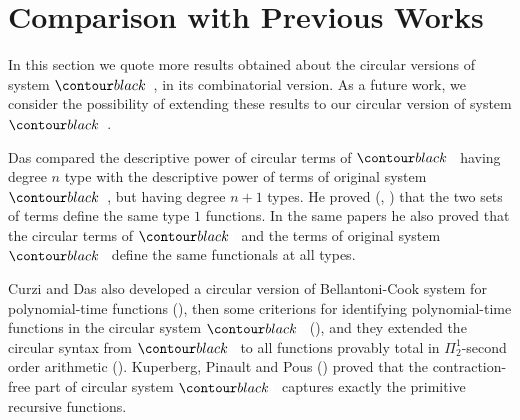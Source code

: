 \section{Comparison with Previous Works}
\label{section-comparison}

In this section we quote more results obtained about the circular versions of system $\systemT$,
in its combinatorial version. As a future work, we consider the possibility of extending these results
to our circular version of system $\systemT$.

Das compared the descriptive power of circular terms of $\systemT$ 
having degree $n$ type with the descriptive power of terms of original system $\systemT$,
but having degree $n+1$ types. 
He proved (\cite{2021-Anupam-Das}, \cite{DBLP:conf/fscd/000221})
that the two sets of terms define the same type $1$ functions. In the same papers he also proved 
that the circular terms of $\systemT$ and the terms of original system $\systemT$ 
define the same functionals at all types.

Curzi and Das also developed a circular version of Bellantoni-Cook system for 
polynomial-time functions (\cite{DBLP:conf/lics/Curzi022}), 
then some criterions for identifying polynomial-time functions
in the circular system $\systemT$ (\cite{DBLP:conf/csl/Curzi023}),
and they extended the circular syntax from $\systemT$ to all functions provably total in 
$\Pi^1_2$-second order arithmetic (\cite{DBLP:conf/lics/Curzi023}).
Kuperberg, Pinault and Pous (\cite{2021-Kuperberg-Pinault-Pous})
proved that the contraction-free part of circular system $\systemT$
captures exactly the primitive recursive functions.
